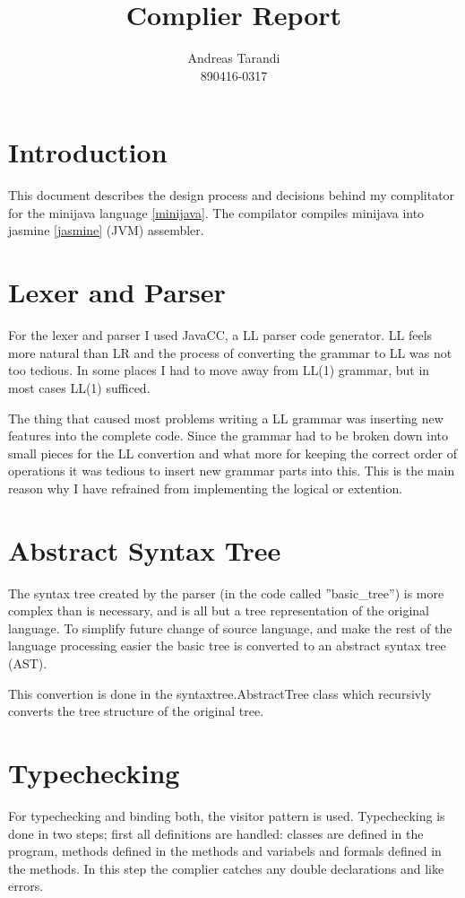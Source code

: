 \documentclass[a4paper,11pt]{article}
\author{Andreas Tarandi\\890416-0317}
\title{Complier Report}
\begin{document}
   \maketitle

   \section{Introduction}
   This document describes the design process and decisions behind my complitator for the minijava language \ref{minijava}. The compilator compiles minijava into jasmine \ref{jasmine} (JVM) assembler.

   \section{Lexer and Parser}
   For the lexer and parser I used JavaCC, a LL parser code generator. LL feels more natural than LR and the 
   process of converting the grammar to LL was not too tedious. In some places I had to move away from LL(1) grammar, but in most cases LL(1) sufficed.

   The thing that caused most problems writing a LL grammar was inserting new features into the complete code. Since the grammar had to be broken down into small pieces for 
   the LL convertion and what more for keeping the correct order of operations it was tedious to insert new grammar parts into this. This is the main reason why I have refrained from
   implementing the logical or extention.

   \section{Abstract Syntax Tree}
   The syntax tree created by the parser (in the code called ''basic\_tree'') is more complex than
   is necessary, and is all but a tree representation of the original language. To simplify future change of source language, and make the rest of the language processing easier the basic tree is
   converted to an abstract syntax tree (AST).

   This convertion is done in the syntaxtree.AbstractTree class which recursivly converts the tree structure of the original tree.

   \section{Typechecking}

   For typechecking and binding both, the visitor pattern is used. Typechecking is done in two steps; first all definitions are handled: 
   classes are defined in the program, methods defined in the methods and variabels and formals defined in the methods. In this step the complier catches any
   double declarations and like errors.
\end{document}
